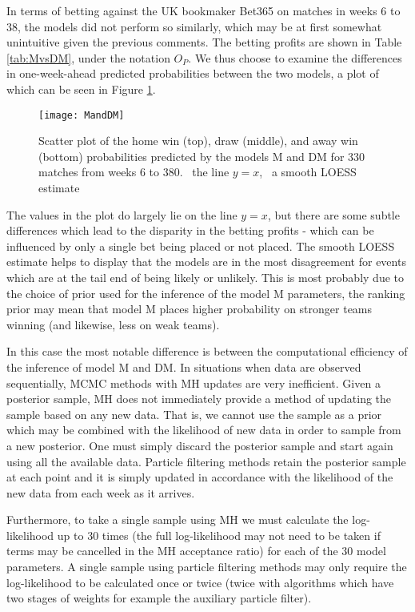 In terms of betting against the UK bookmaker Bet365 on matches in weeks 6 to 38, the models did not perform so
similarly, which may be at first somewhat unintuitive given the previous comments. The betting profits are shown in
Table \ref{tab:MvsDM}, under the notation \(O_P\). We thus choose to examine the differences in one-week-ahead predicted
probabilities between the two models, a plot of which can be seen in Figure \ref{fig:MandDM}.
\begin{figure}[htp]
\begin{center}
\texttt{[image: MandDM]}
\caption{Scatter plot of the home win (top), draw (middle), and away win (bottom) probabilities predicted by the models
M and DM for 330 matches from weeks 6 to 380. \protect\redDashedLine\ the line \(y = x\), \protect\blueSolidLine\ a
smooth LOESS estimate}
\label{fig:MandDM}
\end{center}
\end{figure} 
The values in the plot do largely lie on the line \(y = x\), but there are some subtle differences which lead to the
disparity in the betting profits - which can be influenced by only a single bet being placed or not placed. The smooth
\gls{LOESS} estimate helps to display that the models are in the most disagreement for events which are at the tail end
of being likely or unlikely. This is most probably due to the choice of prior used for the inference of the model M
parameters, the ranking prior may mean that model M places higher probability on stronger teams winning (and likewise,
less on weak teams).

In this case the most notable difference is between the computational efficiency of the inference of model M and DM.
In situations when data are observed sequentially, \gls{MCMC} methods with \gls{MH} updates are very inefficient.
Given a posterior sample, \gls{MH} does not immediately provide a method of updating the sample based on any new data.
That is, we cannot use the sample as a prior which may be combined with the likelihood of new data in order to sample
from a new posterior. One must simply discard the posterior sample and start again using all the available data.
Particle filtering methods retain the posterior sample at each point and it is simply updated in accordance with the
likelihood of the new data from each week as it arrives.

Furthermore, to take a single sample using \gls{MH} we must calculate the log-likelihood up to 30 times (the full
log-likelihood may not need to be taken if terms may be cancelled in the \gls{MH} acceptance ratio) for each of the 30
model parameters. A single sample using particle filtering methods may only require the log-likelihood to be calculated
once or twice (twice with algorithms which have two stages of weights for example the auxiliary particle filter).

